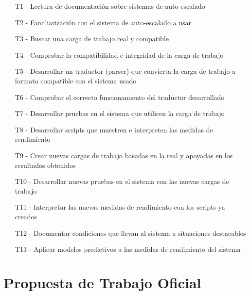 \begin{enumerate}
    \item[T1 -] Lectura de documentación sobre sistemas de auto-escalado
    \item[T2 -] Familiarización con el sistema de auto-escalado a usar
    \item[T3 -] Buscar una carga de trabajo real y compatible
    \item[T4 -] Comprobar la compatibilidad e integridad de la carga de trabajo
    \item[T5 -] Desarrollar un traductor (parser) que convierta la carga de trabajo a formato compatible con el sistema usado
    \item[T6 -] Comprobar el correcto funcionamiento del traductor desarrollado
    \item[T7 -] Desarrollar pruebas en el sistema que utilicen la carga de trabajo
    \item[T8 -] Desarrollar scripts que muestren e interpreten las medidas de rendimiento
    \item[T9 -] Crear nuevas cargas de trabajo basadas en la real y apoyadas en los resultados obtenidos
    \item[T10 -] Desarrollar nuevas pruebas en el sistema con las nuevas cargas de trabajo
    \item[T11 -] Interpretar las nuevas medidas de rendimiento con los scripts ya creados
    \item[T12 -] Documentar condiciones que llevan al sistema a situaciones destacables
    \item[T13 -] Aplicar modelos predictivos a las medidas de rendimiento del sistema
\end{enumerate}


\begin{landscape}

\end{landscape}


\chapter*{Propuesta de Trabajo Oficial}


{}
